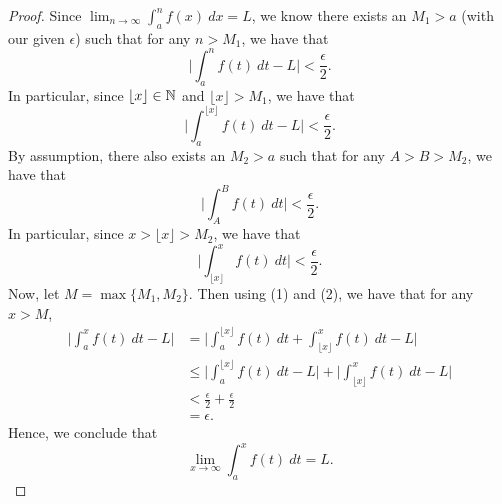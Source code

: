 \documentclass[a4paper]{article}
\begin{document}
\begin{proof}
Since \( \lim_{ n \to \infty  } \int_{ a }^{ n }  f(x) \ dx = L   \), we know there exists an \( {M}_{1} > a  \) (with our given \( \epsilon \)) such that for any \( n  > {M}_{1} \), we have that 
\[  \Big| \int_{ a }^{ n }  f(t) \ dt  - L  \Big| < \frac{ \epsilon }{ 2 }.  \]
In particular, since \( \lfloor x  \rfloor \in \mathbb{N} \) and \( \lfloor x  \rfloor > {M}_{1} \), we have that 
\[  \Big| \int_{ a }^{ \lfloor x  \rfloor }  f(t) \ dt - L  \Big| < \frac{ \epsilon }{ 2 }.  \tag{1}  \]
By assumption, there also exists an \( {M}_{2} > a  \) such that for any \( A > B   > {M}_{2} \), we have that
\[  \Big| \int_{ A }^{ B } f(t)  \ dt \Big| < \frac{ \epsilon }{ 2 }.   \]
In particular, since \( x > \lfloor x  \rfloor > {M}_{2} \), we have that 
\[ \Big| \int_{ \lfloor x \rfloor }^{ x  }  f(t) \ dt  \Big|  < \frac{ \epsilon }{ 2 }. \tag{2}  \]
Now, let \( M = \max \{ {M}_{1}, {M}_{2} \}  \). Then using (1) and (2), we have that for any \( x  > M  \), 
\begin{align*}
    \Big| \int_{ a }^{ x }  f(t) \ dt - L  \Big| &= \Big| \int_{ a }^{ \lfloor x \rfloor } f(t) \ dt + \int_{ \lfloor x \rfloor }^{ x  } f(t) \ dt - L  \Big|  \\
                                                 &\leq \Big| \int_{ a }^{ \lfloor x \rfloor }  f(t) \ dt - L \Big|  + \Big| \int_{ \lfloor x \rfloor }^{ x  } f(t) \ dt - L  \Big|  \\
                                                 &< \frac{ \epsilon }{ 2 }  + \frac{ \epsilon }{ 2 } \\
                                                 &= \epsilon.
\end{align*}
Hence, we conclude that 
\[  \lim_{ x \to \infty  } \int_{ a }^{ x  }  f(t) \ dt = L.  \]
\end{proof}
\end{document}
